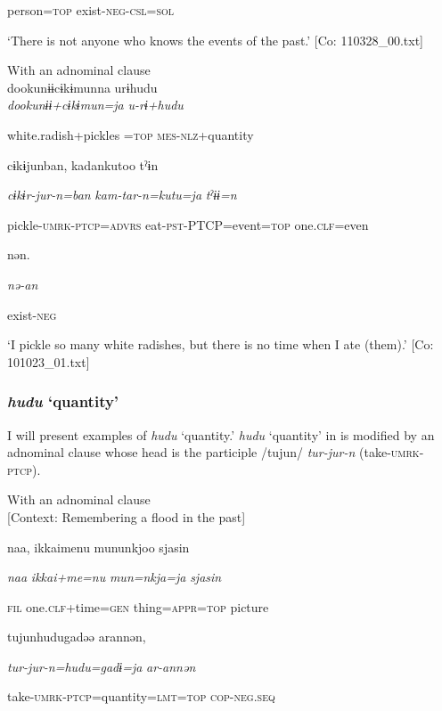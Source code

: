       person=\textsc{top}  exist-\textsc{neg}-\textsc{csl}=\textsc{sol}

\glt ‘There is not anyone who knows the events of the past.’ [Co: 110328\_00.txt]
\z

 \ex With an adnominal clause\\
{\TM}
\gll  dookunɨɨcɨkɨmunna  urɨhudu\\

      \textit{dookunɨɨ+cɨkɨmun=ja}  \textit{u-rɨ+hudu}

      white.radish+pickles =\textsc{top}  \textsc{mes}-\textsc{nlz}+quantity

      cɨkɨjunban,  kadankutoo  tˀɨn

      \textit{cɨkɨr-jur-n=ban}  \textit{kam-tar-n=kutu=ja}  \textit{tˀɨɨ=n}

      pickle-\textsc{umrk}-\textsc{ptcp}=\textsc{advrs}  eat-\textsc{pst}-PTCP=event=\textsc{top}  one.\textsc{clf}=even

      nən.

      \textit{nə-an}

      exist-\textsc{neg}

\glt ‘I pickle so many white radishes, but there is no time when I ate (them).’ [Co: 101023\_01.txt]
\z

\subsubsection{\textit{hudu} ‘quantity’}

I will present examples of \textit{hudu} ‘quantity.’ \textit{hudu} ‘quantity’ in  is modified by an adnominal clause whose head is the participle /tujun/ \textit{tur-jur-n} (take-\textsc{umrk}-\textsc{ptcp}).

\ea\label{ex:6-16}
 With an adnominal clause\\{}
[Context: Remembering a flood in the past]

{\TM}
\gll naa,  {\textbar}ikkaime{\textbar}nu  mununkjoo  sjasin

    \textit{naa}  \textit{ikkai+me=nu}  \textit{mun=nkja=ja}  \textit{sjasin}

    \textsc{fil}  one.\textsc{clf}+time=\textsc{gen}  thing=\textsc{appr}=\textsc{top}  picture

    tujunhudugadəə  arannən,

    \textit{tur-jur-n=hudu=gadɨ=ja}  \textit{ar-annən}

    take-\textsc{umrk}-\textsc{ptcp}=quantity=\textsc{lmt}=\textsc{top}  \textsc{cop}-\textsc{neg}.\textsc{seq}

